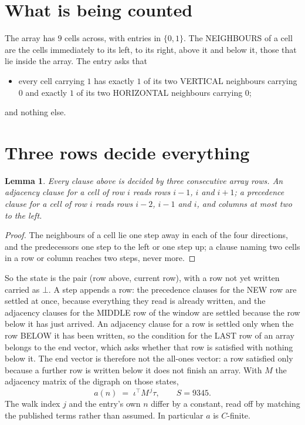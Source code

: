 \documentclass[11pt,a4paper]{article}
\theoremstyle{plain}
\newtheorem{lemma}[theorem]{Lemma}
\theoremstyle{definition}
\begin{document}
\section{What is being counted}

The array has $9$ cells across, with entries in $\{0,1\}$. The NEIGHBOURS of a cell are the
cells immediately to its left, to its right, above it and below it, those that lie inside the
array. The entry asks that
\begin{itemize}
\item every cell carrying $1$ has exactly $1$ of its two VERTICAL neighbours carrying $0$ and exactly $1$ of its two HORIZONTAL neighbours carrying $0$;
\end{itemize}
and nothing else.

\section{Three rows decide everything}

\begin{lemma}\label{lem:win}
Every clause above is decided by three consecutive array rows. An adjacency clause for a cell
of row $i$ reads rows $i-1$, $i$ and $i+1$; a precedence clause for a cell of row $i$ reads
rows $i-2$, $i-1$ and $i$, and columns at most two to the left.
\end{lemma}

\begin{proof}
The neighbours of a cell lie one step away in each of the four directions, and the predecessors
one step to the left or one step up; a clause naming two cells in a row or column reaches two
steps, never more.
\end{proof}

So the state is the pair (row above, current row), with a row not yet written carried as
$\bot$. A step appends a row: the precedence clauses for the NEW row are settled at once,
because everything they read is already written, and the adjacency clauses for the MIDDLE row
of the window are settled because the row below it has just arrived. An adjacency clause for a row is settled only when the row BELOW it has been
written, so the condition for the LAST row of an array belongs to the end vector, which asks
whether that row is satisfied with nothing below it. The end vector is therefore not the
all-ones vector: a row satisfied only because a further row is written below it does not
finish an array. With $M$ the
adjacency matrix of the digraph on those states,
\[
a(n)\;=\;\iota^{\!\top}M^{\,j}\tau ,\qquad S=9345.
\]
The walk index $j$ and the entry's own $n$ differ by a constant, read off by matching the
published terms rather than assumed. In particular $a$ is $C$-finite.
\end{document}
